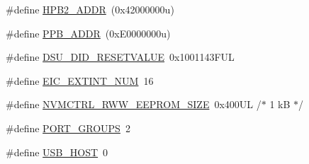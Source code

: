 \begin{DoxyCompactItemize}
\item 
\#define \mbox{\hyperlink{group___s_a_m_d21_e15_l__definitions_gaef42fa53ddf169a2a50be70d29f73571}{H\+P\+B2\+\_\+\+A\+D\+DR}}~(0x42000000u)
\item 
\#define \mbox{\hyperlink{group___s_a_m_d21_e15_l__definitions_ga8895d0a3a9a3126cc44330f86c8ce564}{P\+P\+B\+\_\+\+A\+D\+DR}}~(0x\+E0000000u)
\item 
\#define \mbox{\hyperlink{group___s_a_m_d21_e15_l__definitions_gada75131d542c9e1966238f5488f89bd6}{D\+S\+U\+\_\+\+D\+I\+D\+\_\+\+R\+E\+S\+E\+T\+V\+A\+L\+UE}}~0x1001143\+F\+UL
\item 
\#define \mbox{\hyperlink{group___s_a_m_d21_e15_l__definitions_ga88ebc38c95506296f5d21f82476296ae}{E\+I\+C\+\_\+\+E\+X\+T\+I\+N\+T\+\_\+\+N\+UM}}~16
\item 
\#define \mbox{\hyperlink{group___s_a_m_d21_e15_l__definitions_gacb7a115808eeb0b50bd55888f9ba65ae}{N\+V\+M\+C\+T\+R\+L\+\_\+\+R\+W\+W\+\_\+\+E\+E\+P\+R\+O\+M\+\_\+\+S\+I\+ZE}}~0x400\+U\+L /$\ast$ 1 k\+B $\ast$/
\item 
\#define \mbox{\hyperlink{group___s_a_m_d21_e15_l__definitions_gab9243ffe03a1dc631b57a495b4b3d467}{P\+O\+R\+T\+\_\+\+G\+R\+O\+U\+PS}}~2
\item 
\#define \mbox{\hyperlink{group___s_a_m_d21_e15_l__definitions_ga856aa08fb33114928cbc8635be1792e4}{U\+S\+B\+\_\+\+H\+O\+ST}}~0
\end{DoxyCompactItemize}
